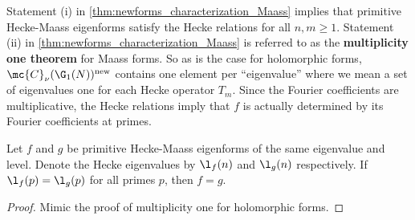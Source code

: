     Statement (i) in \cref{thm:newforms_characterization_Maass} implies that primitive Hecke-Maass eigenforms satisfy the Hecke relations for all $n,m \ge 1$. Statement (ii) in \cref{thm:newforms_characterization_Maass} is referred to as the \textbf{multiplicity one theorem} for Maass forms. So as is the case for holomorphic forms, $\mc{C}_{\nu}(\G_{1}(N))^{\mathrm{new}}$ contains one element per ``eigenvalue'' where we mean a set of eigenvalues one for each Hecke operator $T_{m}$. Since the Fourier coefficients are multiplicative, the Hecke relations imply that $f$ is actually determined by its Fourier coefficients at primes. 
    
    \begin{theorem}
      Let $f$ and $g$ be primitive Hecke-Maass eigenforms of the same eigenvalue and level. Denote the Hecke eigenvalues by $\l_{f}(n)$ and $\l_{g}(n)$ respectively. If $\l_{f}(p) = \l_{g}(p)$ for all primes $p$, then $f = g$.
    \end{theorem}
    \begin{proof}
      Mimic the proof of multiplicity one for holomorphic forms.
    \end{proof}

